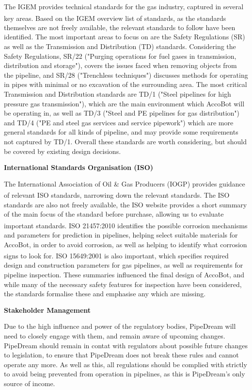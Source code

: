 \documentclass[11pt]{article}		%
\newcommand{\supercite}[1]{\textsuperscript{\cite{#1}}}		%
\begin{document}
			The IGEM provides technical standards for the gas industry, captured in several key areas.
			Based on the IGEM overview list of standards\supercite{institution2021igem}, as the standards themselves are not freely available, the relevant standards to follow have been identified.
			The most important areas to focus on are the Safety Regulations (SR) as well as the Transmission and Distribution (TD) standards.
			Considering the Safety Regulations, SR/22 ("Purging operations for fuel gases in transmission, distribution and storage"), covers the issues faced when removing objects from the pipeline, and SR/28 ("Trenchless techniques") discusses methods for operating in pipes with minimal or no excavation of the surrounding area.
			The most critical Transmission and Distribution standards are TD/1 ("Steel pipelines for high pressure gas transmission"), which are the main environment which AccoBot will be operating in, as well as TD/3 ("Steel and PE pipelines for gas distribution") and TD/4 ("PE and steel gas services and service pipework") which are more general standards for all kinds of pipeline, and may provide some requirements not captured by TD/1.
			Overall these standards are worth considering, but should be covered by existing design decisions.
			
			\textbf{International Standards Organisation (ISO)}
			
			The International Association of Oil \& Gas Producers (IOGP) provides guidance of relevant ISO standards\supercite{iogp2017standards}, narrowing down the relevant standards.
			The ISO standards are also not freely available, the ISO website provides a short summary of the main focus of the standard before purchase, allowing us to evaluate important standards.
			ISO 21457:2010\supercite{iso21457} identifies the possible corrosion mechanisms and parameters for prediction in pipelines, helping select suitable materials for AccoBot, in order to avoid corrosion, as well as helping to identify what corrosion signs to look for.
			ISO 15649:2001\supercite{iso15649} is also important, which specifies required design and construction parameters for gas pipelines, as well as requirements for pipeline inspection.
			These summaries influenced the final design of AccoBot, and while many of the necessary safety features for inspection have been considered, the standards formalise these and emphasise any which are missing.
		    
		    \textbf{Stakeholder Management}
		    
		    Due to the high influence and power of the regulatory bodies, PipeDream will need to closely engage with them, and remain aware of upcoming changes.
		    PipeDream should remain in contat with regulators about possible future changes to legislation, to ensure that PipeDream does not break these rules and cannot operate any more.
		    As well as this, all regulations should be complied with strictly to avoid being prevented from operation in pipelines, as this is PipeDream's only source of income.
		    
\end{document}
